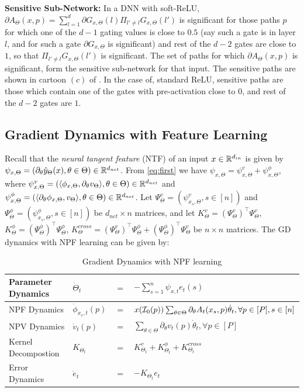 \textbf{Sensitive Sub-Network:} In a DNN with soft-ReLU, $\partial A_{\Theta}(x,p)=\sum_{l=1}^d \partial G_{x,\Theta}(l)\Pi_{l'\neq l}G_{x,\Theta}(l')$ is significant for those paths $p$ for which one of the $d-1$ gating values is close to $0.5$ (say such a gate is in layer $l$, and for such a gate $\partial G_{x,\Theta}$ is significant) and rest of the $d-2$ gates are close to $1$, so that $\Pi_{l'\neq l}G_{x,\Theta}(l')$ is significant. The set of paths for which $\partial A_{\Theta}(x,p)$ is significant, form the sensitive sub-network for that input. The sensitive paths are shown in cartoon $(c)$ of . In the case of, standard ReLU, sensitive paths are those which contain one of the gates with pre-activation close to $0$, and rest of the $d-2$ gates are $1$.
\subsection{Gradient Dynamics with Feature Learning}
Recall that the \emph{neural tangent feature} (NTF) of an input $x\in\mathbb{R}^{d_{in}}$ is given by $\psi_{x,\Theta}=\left(\partial_{\theta}\hat{y}_{\Theta}(x),\theta\in\Theta\right)\in\mathbb{R}^{d_{net}}$. From \eqref{eq:first} we have $\psi_{x,\Theta}=\psi^v_{x,\Theta}+\psi^{\phi}_{x,\Theta}$, where $\psi^v_{x,\Theta}=\left(\langle \phi_{x,\Theta}, \partial_{\theta} v_{\Theta}\rangle,\theta\in\Theta\right)\in\mathbb{R}^{d_{net}}$ and  $\psi^{\phi}_{x,\Theta}=\left(\langle \partial_{\theta}\phi_{x,\Theta}, v_{\Theta}\rangle,\theta\in\Theta\right)\in\mathbb{R}^{d_{net}}$.  Let $\Psi^v_{\Theta}=\left(\psi^v_{x_s,\Theta},s\in[n]\right)$ and $\Psi^{\phi}_{\Theta}=\left(\psi^{\phi}_{x_s,\Theta},s\in[n]\right)$ be $d_{net}\times n$ matrices, and let $K^{v}_{\Theta}=(\Psi^{v}_{\Theta})^\top \Psi^{v}_{\Theta}$, $K^{\phi}_{\Theta}=(\Psi^{\phi}_{\Theta})^\top \Psi^{\phi}_{\Theta}$, $K^{cross}_{\Theta}=(\Psi^v_{\Theta})^\top \Psi^{\phi}_{\Theta}+(\Psi^{\phi}_{\Theta})^\top\Psi^{v}_{\Theta}$ be $n\times n$ matrices. The GD dynamics with NPF learning can be given by:
\FloatBarrier
\begin{table}[h]
\begin{tabular}{| l | lll |}\hline
Parameter Dynamics & $\dot{\Theta}_t$&$=$&$-\sum_{s=1}^n \psi_{x,t}e_t(s)$\\\hline
NPF Dynamics& $\dot{\phi}_{x_s,t}(p)$&$=$&$x(\mathcal{I}_0(p))\sum_{\theta\in\Theta}\partial_{\theta}A_t(x_s,p)\dot{\theta}_t,\forall p\in[P], s\in[n]$\\\hline
NPV Dynamics& $\dot{v}_t(p)$&$=$&$\sum_{\theta\in\Theta}\partial_{\theta}v_t(p)\dot{\theta}_t,\forall p\in[P]$\\\hline
Kernel Decompostion& $K_{\Theta_t}$&$=$&$K^v_{\Theta_t}+K^{\phi}_{\Theta_t}+K^{cross}_{\Theta_t}$\\\hline
Error Dynamics& $\dot{e}_t$&$=$&$-K_{\Theta_t}e_t$\\\hline
\end{tabular}
\caption{Gradient Dynamics with NPF learning}
\label{tb:graddyna} 
\end{table}
